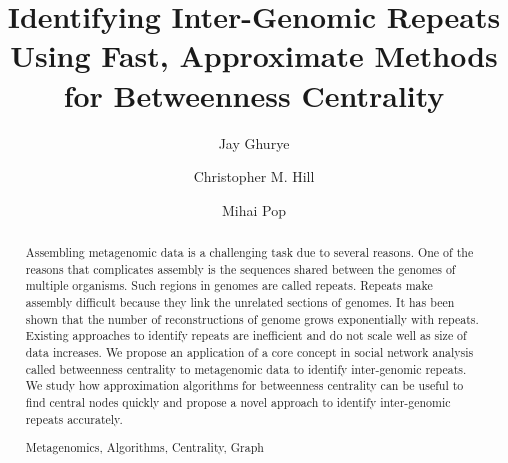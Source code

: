 \documentclass[runningheads,a4paper]{llncs}
\newcommand{\keywords}[1]{\par\addvspace\baselineskip
\noindent\keywordname\enspace\ignorespaces#1}
\begin{document}
\mainmatter  %

\title{Identifying Inter-Genomic Repeats Using Fast, Approximate Methods for Betweenness Centrality}


%
%
\author{Jay Ghurye%
\and Christopher M. Hill\and Mihai Pop}
%


%
%

\maketitle


\begin{abstract}
Assembling metagenomic data is a challenging task due to several reasons. One of the reasons that complicates assembly is the sequences shared between the genomes of multiple organisms. Such regions in genomes are called repeats. Repeats make assembly difficult because they link the unrelated sections of genomes. It has been shown that the number of reconstructions of genome grows exponentially with repeats. Existing approaches to identify repeats are inefficient and do not scale well as size of data increases. We propose an application of a core concept in social network analysis called betweenness centrality to metagenomic data to identify inter-genomic repeats. We study how approximation algorithms for betweenness centrality can be useful to find central nodes quickly and propose a novel approach to identify inter-genomic repeats accurately. 
\keywords{Metagenomics, Algorithms, Centrality, Graph}
\end{abstract}
\end{document}
